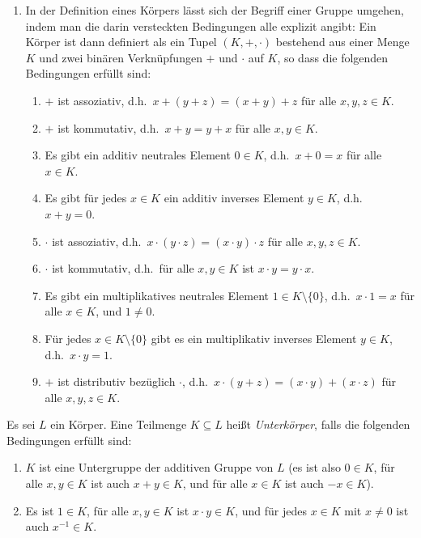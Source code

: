 \begin{bem}
\begin{enumerate}[leftmargin=*]
  \item
   In der Definition eines Körpers lässt sich der Begriff einer Gruppe umgehen, indem man die darin versteckten Bedingungen alle explizit angibt: Ein Körper ist dann definiert als ein Tupel $(K,+,\cdot)$ bestehend aus einer Menge $K$ und zwei binären Verknüpfungen $+$ und $\cdot$ auf $K$, so dass die folgenden Bedingungen erfüllt sind:
   \begin{enumerate}[label=\roman*)]
    \item
     $+$ ist assoziativ, d.h.\ $x+(y+z) = (x+y)+z$ für alle $x,y,z \in K$.
    \item
     $+$ ist kommutativ, d.h.\ $x+y = y+x$ für alle $x,y \in K$.
    \item
     Es gibt ein additiv neutrales Element $0 \in K$, d.h.\ $x + 0 = x$ für alle $x \in K$.
    \item
     Es gibt für jedes $x \in K$ ein additiv inverses Element $y \in K$, d.h.\ $x+y = 0$.
    \item
     $\cdot$ ist assoziativ, d.h.\ $x \cdot (y \cdot z) = (x \cdot y) \cdot z$ für alle $x,y,z \in K$.
    \item
     $\cdot$ ist kommutativ, d.h.\ für alle $x,y \in K$ ist $x \cdot y = y \cdot x$.
    \item
     Es gibt ein multiplikatives neutrales Element $1 \in K\setminus\{0\}$, d.h.\ $x \cdot 1 = x$ für alle $x \in K$, und $1 \neq 0$.
    \item
     Für jedes $x \in K\setminus\{0\}$ gibt es ein multiplikativ inverses Element $y \in K$, d.h.\ $x \cdot y = 1$.
    \item
     $+$ ist distributiv bezüglich $\cdot$, d.h.\ $x \cdot (y+z) = (x \cdot y) + (x \cdot z)$ für alle $x,y,z \in K$.
   \end{enumerate}
 \end{enumerate}
\end{bem}


\begin{defi}
 Es sei $L$ ein Körper. Eine Teilmenge $K \subseteq L$ heißt \emph{Unterkörper}, falls die folgenden Bedingungen erfüllt sind:
 \begin{enumerate}[label=\roman*)]
  \item
   $K$ ist eine Untergruppe der additiven Gruppe von $L$ (es ist also $0 \in K$, für alle $x,y \in K$ ist auch $x+y \in K$, und für alle $x \in K$ ist auch $-x \in K$).
  \item
   Es ist $1 \in K$, für alle $x,y \in K$ ist $x \cdot y \in K$, und für jedes $x \in K$ mit $x \neq 0$ ist auch $x^{-1} \in K$.
 \end{enumerate}
\end{defi}


